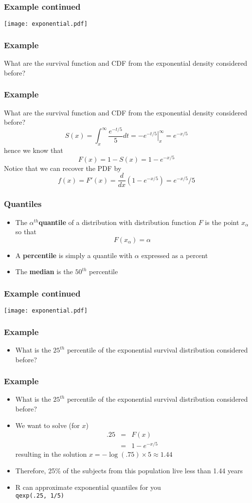 \documentclass[aspectratio=169]{beamer}
\begin{document}
\begin{frame}
\frametitle{Example continued}
   \texttt{[image: exponential.pdf]}
\end{frame}

\begin{frame}
\frametitle{Example}
What are the survival function and CDF from the exponential density considered before?
\end{frame}

\begin{frame}
\frametitle{Example}
What are the survival function and CDF from the exponential density considered before?
$$
S(x) = \int_x^\infty  \frac{e^{-t/5}}{5}dt =  \left. -e^{-t/5} \right|_{x}^\infty = e^{-x/5}
$$
hence we know that
$$
F(x) = 1 - S(x) = 1 - e^{-x/5}
$$
Notice that we can recover the PDF by
$$
f(x) = F'(x) = \frac{d}{dx} (1 -  e^{-x/5}) = e^{-x/5}/5
$$
\end{frame}


\begin{frame}
\frametitle{Quantiles}
\begin{itemize}
\item The  {\bf $\alpha^{th}$quantile} of a distribution with distribution function 
$F$ is the point $x_\alpha$ so that
$$
F(x_\alpha) = \alpha
$$
\item A {\bf percentile} is simply a quantile with $\alpha$ expressed as a percent
\item The {\bf median} is the $50^{th}$ percentile
\end{itemize}
\end{frame}

\begin{frame}
\frametitle{Example continued}
   \texttt{[image: exponential.pdf]}
\end{frame}


\begin{frame}
\frametitle{Example}
\begin{itemize}
\item  What is the $25^{th}$ percentile of the exponential survival distribution considered before?
\end{itemize}
\end{frame}

\begin{frame}
\frametitle{Example}
\begin{itemize}
\item  What is the $25^{th}$ percentile of the exponential survival distribution considered before?
\item We want to solve (for $x$)
\begin{eqnarray*}
.25 & = & F(x) \\  
    & = & 1 - e^{-x/5}
\end{eqnarray*}
resulting in the solution $x = -\log(.75) \times 5 \approx 1.44$
\item Therefore, 25\% of the
subjects from this population live less than 1.44 years
\item R can approximate exponential quantiles for you \\
\texttt{qexp(.25, 1/5)}
\end{itemize}
\end{frame}
\end{document}
